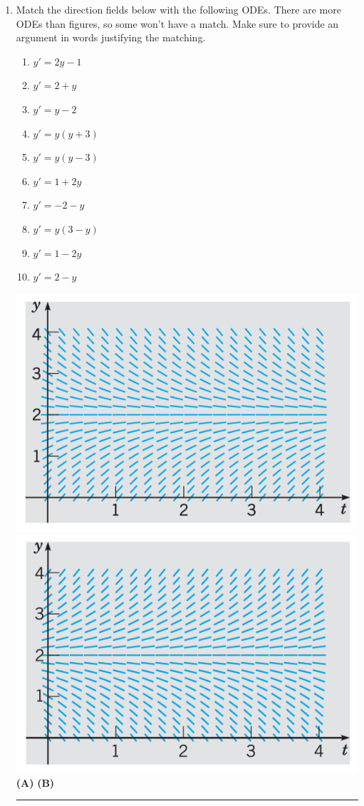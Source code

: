 \begin{enumerate}
\clearpage
\item Match the direction fields below with the following ODEs. There are more ODEs than figures, so some won't have a match. Make sure to provide an argument in words justifying the matching.
\begin{multicols}{2}
    \begin{enumerate}[label={(\roman{enumii})},nosep,itemsep=1mm]
        \item $y'=2y-1$
        \item $y'=2+y$
        \item $y'=y-2$
        \item $y'=y(y+3)$
        \item $y'=y(y-3)$
        \item $y'=1+2y$
        \item $y'=-2-y$
        \item $y'=y(3-y)$
        \item $y'=1-2y$
        \item $y'=2-y$
    \end{enumerate}
    \end{multicols}

\includegraphics[width=0.4\linewidth]{field1}
\includegraphics[width=0.4\linewidth]{field2}\\
\null\hfill\textbf{(A)}\hfill\hfill
\textbf{(B)}\hfill
\null

\vspace{3mm}
\hrule


\end{enumerate}
